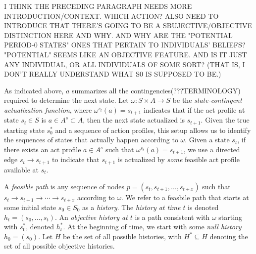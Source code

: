 \documentclass[
11pt,
titlepage,
reqno,
]{article}%
\theoremstyle{definition}
\begin{document}
	I THINK THE PRECEDING PARAGRAPH NEEDS MORE INTRODUCTION/CONTEXT. WHICH ACTION? ALSO NEED TO INTRODUCE THAT THERE'S GOING TO BE A SBUJECTIVE/OBJECTIVE DISTINCTION HERE AND WHY. AND WHY ARE THE "POTENTIAL PERIOD-0 STATES" ONES THAT PERTAIN TO INDIVIDUALS' BELIEFS? "POTENTIAL" SEEMS LIKE AN OBJECTIVE FEATURE. AND IS IT JUST ANY INDIVIDUAL, OR ALL INDIVIDUALS OF SOME SORT? (THAT IS, I DON'T REALLY UNDERSTAND WHAT S0 IS SUPPOSED TO BE.)
	
	As indicated above, $a$ summarizes all the contingencies(???TERMINOLOGY) required to determine the next state. 
	Let $\omega:S\times A\rightarrow S$ be the \textit{state-contingent actualization function}, where $\omega^{s_t}(a)=s_{t+1}$ indicates that if the act profile at state $s_t\in S$ is $a\in A^s\subset A$, then the next state actualized is $s_{t+1}$.
	Given the true starting state $s_0^\ast$ and a sequence of action profiles, this setup allows us to identify the sequences of states that  actually happen according to $\omega$. 
	Given a state $s_t$, if there exists an act profile $a\in A^s$ such that $\omega^{s_t}(a)=s_{t+1}$, we use a directed edge $s_t\rightarrow s_{t+1}$ to indicate that $s_{t+1}$ is actualized by \textit{some} feasible act profile available at $s_t$. 
	
	A \textit{feasible path} is any sequence of nodes $p=(s_t,s_{t+1},\ldots,s_{t+x})$ such that $s_t\rightarrow s_{t+1}\rightarrow \cdots\rightarrow s_{t+x}$ according to $\omega$. 
	We refer to a feasbile path that starts at some initial state $s_0\in S_0$ as a \textit{history}. 
	The  \textit{history at time $t$} is denoted $h_t=(s_0,\ldots,s_t)$.
	An \textit{objective history at $t$} is a path consistent with $\omega$ starting with $s_0^\ast$, denoted $h^\ast_t$. 
	At the beginning of time, we start with some \textit{null history} $h_0=(s_0)$. 
	Let $H$ be the set of all possible histories, with $H^\ast\subseteq H$ denoting the set of all possible objective histories.
	
\end{document}
